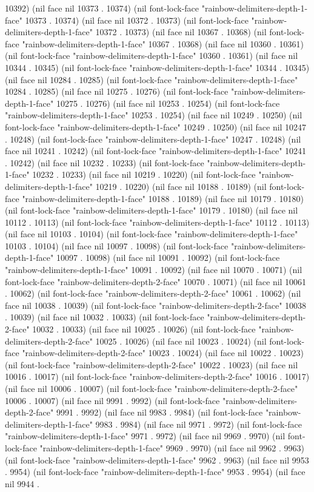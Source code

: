 10392) (nil face nil 10373 . 10374) (nil font-lock-face "rainbow-delimiters-depth-1-face" 10373 . 10374) (nil face nil 10372 . 10373) (nil font-lock-face "rainbow-delimiters-depth-1-face" 10372 . 10373) (nil face nil 10367 . 10368) (nil font-lock-face "rainbow-delimiters-depth-1-face" 10367 . 10368) (nil face nil 10360 . 10361) (nil font-lock-face "rainbow-delimiters-depth-1-face" 10360 . 10361) (nil face nil 10344 . 10345) (nil font-lock-face "rainbow-delimiters-depth-1-face" 10344 . 10345) (nil face nil 10284 . 10285) (nil font-lock-face "rainbow-delimiters-depth-1-face" 10284 . 10285) (nil face nil 10275 . 10276) (nil font-lock-face "rainbow-delimiters-depth-1-face" 10275 . 10276) (nil face nil 10253 . 10254) (nil font-lock-face "rainbow-delimiters-depth-1-face" 10253 . 10254) (nil face nil 10249 . 10250) (nil font-lock-face "rainbow-delimiters-depth-1-face" 10249 . 10250) (nil face nil 10247 . 10248) (nil font-lock-face "rainbow-delimiters-depth-1-face" 10247 . 10248) (nil face nil 10241 . 10242) (nil font-lock-face "rainbow-delimiters-depth-1-face" 10241 . 10242) (nil face nil 10232 . 10233) (nil font-lock-face "rainbow-delimiters-depth-1-face" 10232 . 10233) (nil face nil 10219 . 10220) (nil font-lock-face "rainbow-delimiters-depth-1-face" 10219 . 10220) (nil face nil 10188 . 10189) (nil font-lock-face "rainbow-delimiters-depth-1-face" 10188 . 10189) (nil face nil 10179 . 10180) (nil font-lock-face "rainbow-delimiters-depth-1-face" 10179 . 10180) (nil face nil 10112 . 10113) (nil font-lock-face "rainbow-delimiters-depth-1-face" 10112 . 10113) (nil face nil 10103 . 10104) (nil font-lock-face "rainbow-delimiters-depth-1-face" 10103 . 10104) (nil face nil 10097 . 10098) (nil font-lock-face "rainbow-delimiters-depth-1-face" 10097 . 10098) (nil face nil 10091 . 10092) (nil font-lock-face "rainbow-delimiters-depth-1-face" 10091 . 10092) (nil face nil 10070 . 10071) (nil font-lock-face "rainbow-delimiters-depth-2-face" 10070 . 10071) (nil face nil 10061 . 10062) (nil font-lock-face "rainbow-delimiters-depth-2-face" 10061 . 10062) (nil face nil 10038 . 10039) (nil font-lock-face "rainbow-delimiters-depth-2-face" 10038 . 10039) (nil face nil 10032 . 10033) (nil font-lock-face "rainbow-delimiters-depth-2-face" 10032 . 10033) (nil face nil 10025 . 10026) (nil font-lock-face "rainbow-delimiters-depth-2-face" 10025 . 10026) (nil face nil 10023 . 10024) (nil font-lock-face "rainbow-delimiters-depth-2-face" 10023 . 10024) (nil face nil 10022 . 10023) (nil font-lock-face "rainbow-delimiters-depth-2-face" 10022 . 10023) (nil face nil 10016 . 10017) (nil font-lock-face "rainbow-delimiters-depth-2-face" 10016 . 10017) (nil face nil 10006 . 10007) (nil font-lock-face "rainbow-delimiters-depth-2-face" 10006 . 10007) (nil face nil 9991 . 9992) (nil font-lock-face "rainbow-delimiters-depth-2-face" 9991 . 9992) (nil face nil 9983 . 9984) (nil font-lock-face "rainbow-delimiters-depth-1-face" 9983 . 9984) (nil face nil 9971 . 9972) (nil font-lock-face "rainbow-delimiters-depth-1-face" 9971 . 9972) (nil face nil 9969 . 9970) (nil font-lock-face "rainbow-delimiters-depth-1-face" 9969 . 9970) (nil face nil 9962 . 9963) (nil font-lock-face "rainbow-delimiters-depth-1-face" 9962 . 9963) (nil face nil 9953 . 9954) (nil font-lock-face "rainbow-delimiters-depth-1-face" 9953 . 9954) (nil face nil 9944 . 